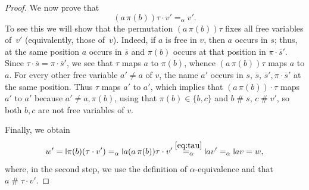 \documentclass[final,a4paper,UKenglish,thm-restate,autoref,numberwithinsect]{lipics-v2021}
\newcommand{\midmid}{\hspace{0.2ex}{\rule[-0.1ex]{0.6pt}{1.65ex}}\hspace{0.2ex}}
\newcommand{\newletter}[1]{{\midmid}#1}
\numberwithin{equation}{section}
\newcommand{\ol}{\overline}
\newcommand{\+}[1]{\mathcal{#1}\xspace}
\newcommand{\fresh}{\mathbin{\#}}
\theoremstyle{definition}
\begin{document}
\begin{proof}
  We now prove that
  \begin{equation}\label{eq:tau}
    (a\, \pi(b))\tau\cdot v' =_\alpha v'.
  \end{equation}
  To see this we will show that the permutation
  $(a\, \pi(b))\tau$ fixes all free variables of~$v'$ (equivalently,
  those of~$v$). Indeed, if $a$ is free in $v$, then $a$ occurs in $s$; thus,
  at the same position $a$ occurs in $\ol{s}$ and $\pi(b)$ occurs at
  that position in $\pi\cdot \ol{s}'$. Since $\tau \cdot \ol s = \pi
  \cdot \ol{s}'$, we see that $\tau$ maps $a$ to $\pi(b)$, whence 
  $(a\, \pi(b))\tau$ maps $a$ to $a$. For every other free variable
  $a'\neq a$ of $v$, the name $a'$ occurs in $s$, $\ol{s}$,
  $\ol{s}', \pi\cdot \ol{s}'$ at the same position. Thus
  $\tau$ maps $a'$ to $a'$, which implies that $(a\, \pi(b))\cdot \tau$ maps
  $a'$ to $a'$ because $a'\neq a,\pi(b)$, using that
  $\pi(b)\in \{b,c\}$ and $b\fresh s$, $c\fresh v'$, so both $b,c$ are
  not free variables of $v$.

  Finally, we obtain 
  \[
    w'
    =
    \newletter \pi(b)(\tau\cdot v')
    =_\alpha
    \newletter a(a\, \pi(b))\tau\cdot v'
    \overset{\eqref{eq:tau}}{=_\alpha}
    \newletter av'
    =_\alpha
    \newletter av
    = w,
  \]
  where, in the second step, we use the definition of $\alpha$-equivalence
  and that $a\fresh \tau\cdot v'$. 
\end{proof}
\end{document}
